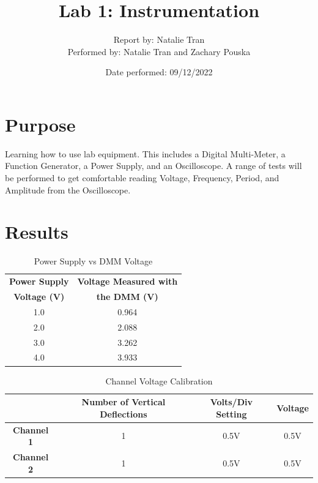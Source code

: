 \documentclass{article}
\title{\textbf{Lab 1: Instrumentation}}
\author{Report by: Natalie Tran\\
Performed by: Natalie Tran and Zachary Pouska}
\date{Date performed: 09/12/2022}
\begin{document}
	\maketitle
	\section*{Purpose}
	Learning how to use lab equipment. This includes a Digital Multi-Meter, a Function Generator, a Power Supply, and an Oscilloscope. A range of tests will be performed to get comfortable reading Voltage, Frequency, Period, and Amplitude from the Oscilloscope. \\
	\section*{Results}
	\begin{table}[ht!]
	\begin{center}
	\caption{Power Supply vs DMM Voltage}
	\vspace{0.2cm}
	\begin{tabular}{c|c}
		\textbf{Power Supply} & \textbf{ Voltage Measured with}\\
		\textbf{Voltage (V)} & \textbf{the DMM (V)}\\
		\hline
		1.0 & 0.964\\
		2.0 & 2.088\\
		3.0 & 3.262\\
		4.0 & 3.933\\
	\end{tabular} 
\end{center}
\end{table}
\begin{table}[h!]
	\caption{Channel Voltage Calibration}
	\begin{center}
	\begin{tabular}{c|c|c|c}
			   & \textbf{Number of Vertical Deflections} & \textbf{Volts/Div Setting} & \textbf{Voltage} \\
			   \hline
		\textbf{Channel 1}  & 1                              & 0.5V              & 0.5V    \\
		\textbf{Channel 2}  & 1                              & 0.5V              & 0.5V    \\
	\end{tabular}
\end{center}
\end{table}
\end{document}
